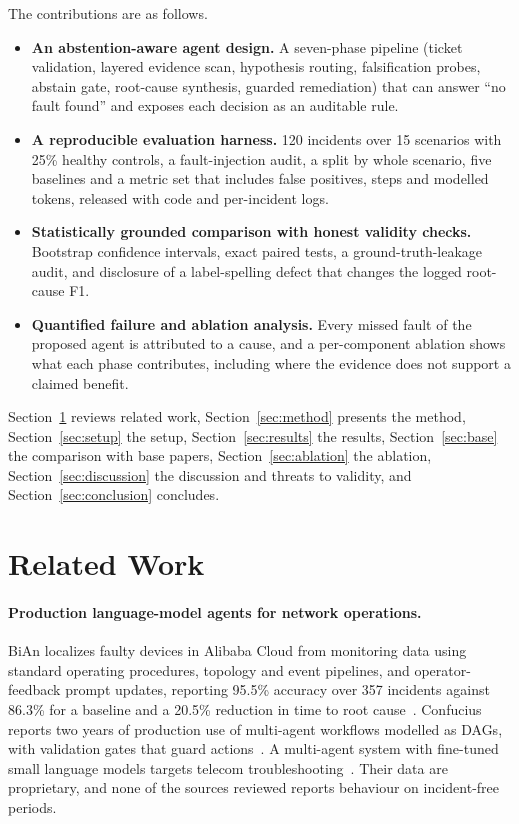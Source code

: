 \documentclass[pdflatex,sn-basic,Numbered,iicol]{sn-jnl}
\begin{document}
The contributions are as follows.
\begin{itemize}
\item \textbf{An abstention-aware agent design.} A seven-phase pipeline (ticket validation, layered evidence scan, hypothesis routing, falsification probes, abstain gate, root-cause synthesis, guarded remediation) that can answer ``no fault found'' and exposes each decision as an auditable rule.
\item \textbf{A reproducible evaluation harness.} 120 incidents over 15 scenarios with 25\% healthy controls, a fault-injection audit, a split by whole scenario, five baselines and a metric set that includes false positives, steps and modelled tokens, released with code and per-incident logs.
\item \textbf{Statistically grounded comparison with honest validity checks.} Bootstrap confidence intervals, exact paired tests, a ground-truth-leakage audit, and disclosure of a label-spelling defect that changes the logged root-cause F1.
\item \textbf{Quantified failure and ablation analysis.} Every missed fault of the proposed agent is attributed to a cause, and a per-component ablation shows what each phase contributes, including where the evidence does not support a claimed benefit.
\end{itemize}

Section~\ref{sec:related} reviews related work, Section~\ref{sec:method} presents the method, Section~\ref{sec:setup} the setup, Section~\ref{sec:results} the results, Section~\ref{sec:base} the comparison with base papers, Section~\ref{sec:ablation} the ablation, Section~\ref{sec:discussion} the discussion and threats to validity, and Section~\ref{sec:conclusion} concludes.

\section{Related Work}\label{sec:related}

\paragraph{Production language-model agents for network operations.} BiAn localizes faulty devices in Alibaba Cloud from monitoring data using standard operating procedures, topology and event pipelines, and operator-feedback prompt updates, reporting 95.5\% accuracy over 357 incidents against 86.3\% for a baseline and a 20.5\% reduction in time to root cause~\cite{wang2025bian}. Confucius reports two years of production use of multi-agent workflows modelled as DAGs, with validation gates that guard actions~\cite{wang2025confucius}. A multi-agent system with fine-tuned small language models targets telecom troubleshooting~\cite{shi2025mas}. Their data are proprietary, and none of the sources reviewed reports behaviour on incident-free periods.
\end{document}
